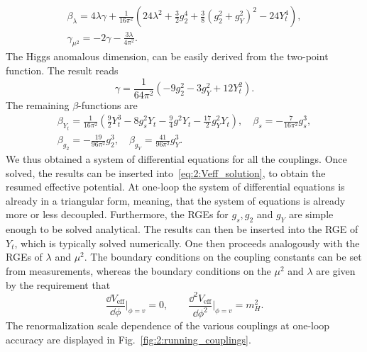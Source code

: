 \begin{equation}
\begin{gathered}
\beta_\lambda = 4 \lambda \gamma + \frac{1}{16 \pi^2} (24 \lambda^2 + \frac{3}{2} g_2^4 + \frac{3}{8} (g_2^2 + g_Y^2)^2 - 24 Y_t^4), \\
\gamma_{\mu^2} = - 2 \gamma - \frac{3 \lambda}{4 \pi^2}.
\end{gathered}
\label{eq:2:beta_lambda_and_gamma_mu2}
\end{equation}
The Higgs anomalous dimension, can be easily derived from the two-point function. The result reads
\begin{equation}
\gamma = \frac{1}{64 \pi^2} \left( -9 g_2^2 - 3 g_Y^2 + 12 Y_t^2 \right).
\end{equation}
The remaining $\beta$-functions are
\begin{equation}
\begin{gathered}
\beta_{Y_t} = \frac{1}{16 \pi^2} \left(\frac{9}{2} Y_t^3 - 8 g_s^2 Y_t - \frac{9}{4} g^2 Y_t - \frac{17}{2} g_Y^2 Y_t \right), \quad \beta_s = - \frac{7}{16 \pi^2} g_s^3, \\
\beta_{g_2} = - \frac{19}{96 \pi^2} g_2^3, \quad \beta_{g_Y} = \frac{41}{96 \pi^2} g_Y^3.
\end{gathered}
\end{equation}
We thus obtained a system of differential equations for all the couplings. Once solved, the results can be inserted into~\eqref{eq:2:Veff_solution}, to obtain the resumed effective potential. At one-loop the system of differential equations is already in a triangular form, meaning, that the system of equations is already more or less decoupled. Furthermore, the \acs{RGE}s for $g_s, g_2$ and $g_Y$ are simple enough to be solved analytical. The results can then be inserted into the \acs{RGE} of $Y_t$, which is typically solved numerically. One then proceeds analogously with the \acs{RGE}s of $\lambda$ and $\mu^2$. The boundary conditions on the coupling constants can be set from measurements, whereas the boundary conditions on the $\mu^2$ and $\lambda$ are given by the requirement that
\begin{equation}
\frac{\dd V_{\text{eff}}}{\dd \phi}\bigg \vert_{\phi = v} = 0, \qquad \frac{\dd^2 V_\text{eff}}{\dd \phi^2} \bigg \vert_{\phi = v} = m_H^2.
\end{equation}
The renormalization scale dependence of the various couplings at one-loop accuracy are displayed in Fig.~\ref{fig:2:running_couplings}.

